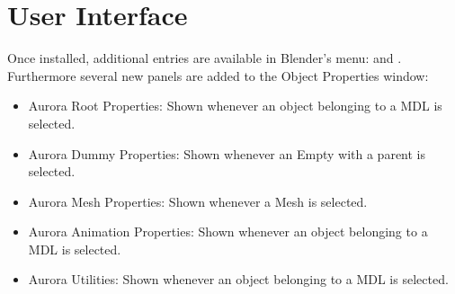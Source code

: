 \section{User Interface}
Once installed, additional entries are available in Blender's menu:  and 
. Furthermore several new panels are added to the Object Properties window:
\begin{itemize}
\item Aurora Root Properties: Shown whenever an object belonging to a MDL is selected.
\item Aurora Dummy Properties: Shown whenever an Empty with a parent is selected.
\item Aurora Mesh Properties: Shown whenever a Mesh is selected.
\item Aurora Animation Properties: Shown whenever an object belonging to a MDL is selected.
\item Aurora Utilities: Shown whenever an object belonging to a MDL is selected.
\end{itemize}